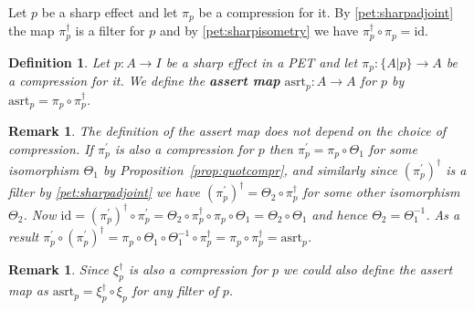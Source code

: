 \documentclass[b5paper,onecolumn,12pt,accepted=2019-05-03, issue=1, volume=1, shorttitle=papers/compositionality-1-1]{compositionalityarticle}
\newcounter{counter}
\numberwithin{counter}{section}
\newtheorem{definition}[counter]{Definition}
\newtheorem{remark}[counter]{Remark}
\newcommand{\asrt}{\text{asrt}}
\newcommand{\id}{\text{id}}
\begin{document}
Let $p$ be a sharp effect and let $\pi_p$ be a compression for it. By \ref{pet:sharpadjoint} the map $\pi_p^\dagger$ is a filter for $p$ and by \ref{pet:sharpisometry} we have $\pi_p^\dagger\circ \pi_p = \id$.

\begin{definition}
	Let $p:A\rightarrow I$ be a sharp effect in a PET and let $\pi_p: \{A\lvert p\}\rightarrow A$ be a compression for it. We define the \textbf{assert map} $\asrt_p:A\rightarrow A$ for $p$ by $\asrt_p = \pi_p\circ \pi_p^\dagger$. 
\end{definition}

\begin{remark}
    The definition of the assert map does not depend on the choice of compression. If $\pi_p^\prime$ is also a compression for $p$ then $\pi_p^\prime = \pi_p\circ\Theta_1$ for some isomorphism $\Theta_1$ by Proposition~\ref{prop:quotcompr}, and similarly since $(\pi_p^\prime)^\dagger$ is a filter by \ref{pet:sharpadjoint} we have $(\pi_p^\prime)^\dagger = \Theta_2\circ\pi_p^\dagger$ for some other isomorphism $\Theta_2$. Now $\id = (\pi_p^\prime)^\dagger\circ \pi_p^\prime = \Theta_2 \circ \pi_p^\dagger \circ \pi_p \circ \Theta_1 = \Theta_2\circ \Theta_1$ and hence $\Theta_2 = \Theta_1^{-1}$. As a result $\pi_p^\prime \circ (\pi_p^\prime)^\dagger = \pi_p\circ \Theta_1\circ \Theta_1^{-1} \circ \pi_p^\dagger = \pi_p \circ \pi_p^\dagger = \asrt_p$.
\end{remark}
\begin{remark}
    Since $\xi_p^\dagger$ is also a compression for $p$ we could also define the assert map as $\asrt_p = \xi_p^\dagger \circ \xi_p$ for any filter of $p$.
\end{remark}

\end{document}
